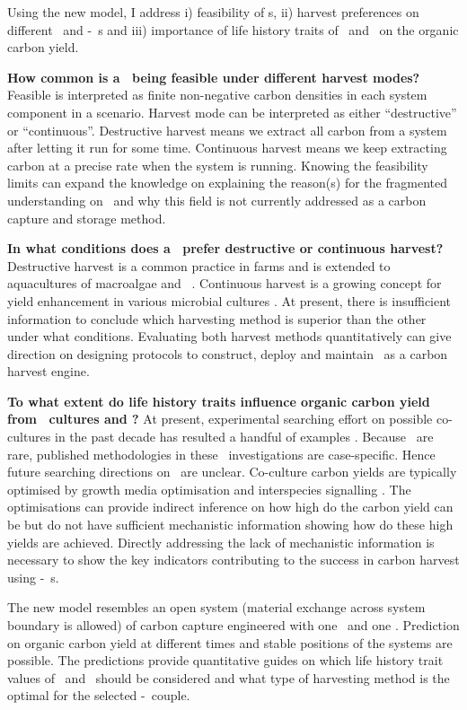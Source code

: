 \documentclass[../thesis.tex]{subfiles} %
\begin{document}
Using the new model, I address \Rn{1}) feasibility of \pbs s, \Rn{2}) harvest preferences on different \phy\ and \phy-\bac\ \pbs s and \Rn{3}) importance of life history traits of \phy\ and \bac\ on the organic carbon yield.

\textbf{How common is a \pbs\ being feasible under different harvest modes?}  Feasible is interpreted as finite non-negative carbon densities in each system component in a scenario.  Harvest mode can be interpreted as either ``destructive” or ``continuous”.  Destructive harvest means we extract all carbon from a system after letting it run for some time.  Continuous harvest means we keep extracting carbon at a precise rate when the system is running.  Knowing the feasibility limits can expand the knowledge on explaining the reason(s) for the fragmented understanding \autocite{fuentes2016impact} on \pbs\ and why this field is not currently addressed as a carbon capture and storage method.

\textbf{In what conditions does a \pbs\ prefer destructive or continuous harvest?}  Destructive harvest is a common practice in farms and is extended to aquacultures of macroalgae \autocite{duarte2017can} and \phy\  \autocite{evanson_2019}.  Continuous harvest is a growing concept for yield enhancement in various microbial cultures \autocite{aytekin2016statistical,fuentes2016impact}.  At present, there is insufficient information to conclude which harvesting method is superior than the other under what conditions.  Evaluating both harvest methods quantitatively can give direction on designing protocols to construct, deploy and maintain \pbs\ as a carbon harvest engine.

\textbf{To what extent do life history traits influence organic carbon yield from \phy\ cultures and \pbs?}  At present, experimental searching effort on possible co-cultures in the past decade has resulted a handful of examples \autocite{fuentes2016impact,santos2014microalgal}.  Because \pbs\ are rare, published methodologies in these \pbs\ investigations are case-specific.  Hence future searching directions on \pbs\ are unclear.  Co-culture carbon yields are typically optimised by growth media optimisation \autocite{aytekin2016statistical,fuentes2016impact} and interspecies signalling \autocite{fuentes2016impact}.  The optimisations can provide indirect inference on how high do the carbon yield can be but do not have sufficient mechanistic information showing how do these high yields are achieved.  Directly addressing the lack of mechanistic information is necessary to show the key indicators contributing to the success in carbon harvest using \phy-\bac\ \pbs s.

The new model resembles an open system (material exchange across system boundary is allowed) of carbon capture engineered with one \phy\ and one \bac.  Prediction on organic carbon yield at different times and stable positions of the systems are possible.  The predictions provide quantitative guides on which life history trait values of \phy\ and \bac\ should be considered and what type of harvesting method is the optimal for the selected \phy-\bac\ couple.
\end{document}
